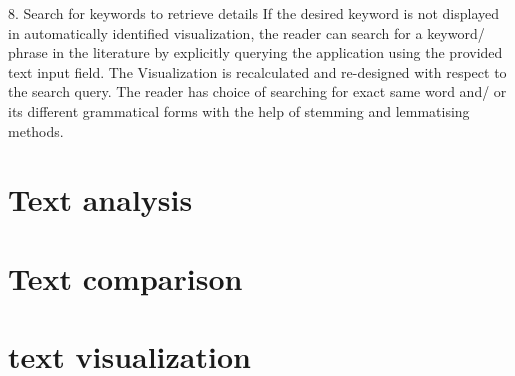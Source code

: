 8.	Search for keywords to retrieve details
If the desired keyword is not displayed in automatically identified visualization, the reader can search for a keyword/ phrase in the literature by explicitly querying the application using the provided text input field. The Visualization is recalculated and re-designed with respect to the search query. The reader has choice of searching for exact same word and/ or its different grammatical forms with the help of stemming and lemmatising methods.

\section{Text analysis}

\section{Text comparison}

\section{text visualization}

